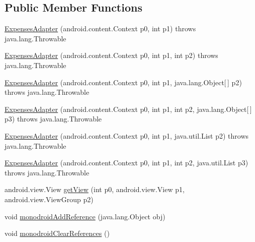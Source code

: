 \subsection*{Public Member Functions}
\begin{DoxyCompactItemize}
\item 
\hyperlink{classfieldservice_1_1android_1_1_expenses_adapter_ac551e52c1475107276e1abdb414e1014}{Expenses\+Adapter} (android.\+content.\+Context p0, int p1)  throws java.\+lang.\+Throwable 	
\item 
\hyperlink{classfieldservice_1_1android_1_1_expenses_adapter_a56c9039f7a51bf33a29d6ff9ebb39a84}{Expenses\+Adapter} (android.\+content.\+Context p0, int p1, int p2)  throws java.\+lang.\+Throwable 	
\item 
\hyperlink{classfieldservice_1_1android_1_1_expenses_adapter_ac74c27417fc67b78609c16f3d62929f8}{Expenses\+Adapter} (android.\+content.\+Context p0, int p1, java.\+lang.\+Object\mbox{[}$\,$\mbox{]} p2)  throws java.\+lang.\+Throwable 	
\item 
\hyperlink{classfieldservice_1_1android_1_1_expenses_adapter_a5bc559c1d398775f0bb525de8350c81e}{Expenses\+Adapter} (android.\+content.\+Context p0, int p1, int p2, java.\+lang.\+Object\mbox{[}$\,$\mbox{]} p3)  throws java.\+lang.\+Throwable 	
\item 
\hyperlink{classfieldservice_1_1android_1_1_expenses_adapter_a8924f1f9560eb24aca8d229387e95a2c}{Expenses\+Adapter} (android.\+content.\+Context p0, int p1, java.\+util.\+List p2)  throws java.\+lang.\+Throwable 	
\item 
\hyperlink{classfieldservice_1_1android_1_1_expenses_adapter_addff6ce485957249556406f5ea2a2fc8}{Expenses\+Adapter} (android.\+content.\+Context p0, int p1, int p2, java.\+util.\+List p3)  throws java.\+lang.\+Throwable 	
\item 
android.\+view.\+View \hyperlink{classfieldservice_1_1android_1_1_expenses_adapter_aeb45c274b65a00c6431b83a44f8361bd}{get\+View} (int p0, android.\+view.\+View p1, android.\+view.\+View\+Group p2)
\item 
void \hyperlink{classfieldservice_1_1android_1_1_expenses_adapter_a4b2f8526e66886477d095ed2fe1cbab6}{monodroid\+Add\+Reference} (java.\+lang.\+Object obj)
\item 
void \hyperlink{classfieldservice_1_1android_1_1_expenses_adapter_a8dc71d1b080bdf20ac1850af3346abbd}{monodroid\+Clear\+References} ()
\end{DoxyCompactItemize}


